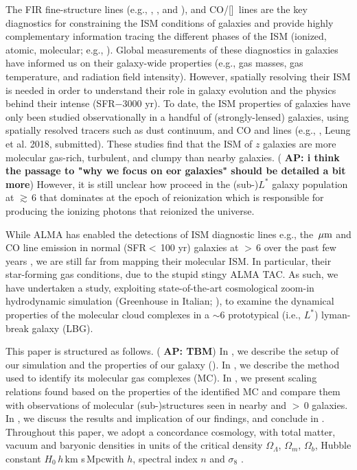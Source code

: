 \documentclass[apj]{emulateapj} %
\newcommand{\AP}[1]{({\bf \color{apcolor} AP: #1})}
\begin{document}
The FIR fine-structure lines (e.g., \cii, \nii, and \oiii), and CO/[\ci]~lines are the key diagnostics for 
constraining the ISM conditions of galaxies and
provide highly complementary information tracing the different phases of the ISM (ionized, 
atomic, molecular; e.g., \citealt{Scoville74a, Rubin85a, Malhotra01a}).
Global measurements of these diagnostics in \highz galaxies 
have informed us on their galaxy-wide properties (e.g., 
gas masses, gas temperature, and radiation field intensity).
However, spatially resolving their ISM is needed in order to understand their role in galaxy evolution and 
the physics behind their intense \SF (SFR$-$3000\,\Msun\,yr\pmOne).
To date, the ISM properties of \highz galaxies 
have only been studied observationally in a handful of (strongly-lensed) 
galaxies, using spatially resolved tracers such as 
dust continuum, and CO and \cii lines (e.g., \citealt{Swinbank11a, Hodge15a, Ferkinhoff15a, Hodge16a},
Leung et al. 2018, submitted).
These studies find that the ISM of $z$ galaxies are more 
molecular gas-rich, turbulent, and clumpy than nearby galaxies.
\AP{i think the passage to "why we focus on eor galaxies" should be detailed a bit more}
However, it is still unclear how \SF proceed in the (sub-)$L^*$ galaxy population at \z$\gtrsim$\,6 
that dominates  \SF at the epoch of reionization which is responsible for producing the 
ionizing photons that reionized the universe.

While ALMA has enabled the detections of 
ISM diagnostic lines e.g., the \,$\mbox{$\mu$m}$ and CO line emission in 
normal (SFR$<$\,100\,\Msun\,yr\pmOne) galaxies at \z$>$\,6 over the past few years \citep[e.g.,][]{Smit18a},
we are still far from mapping their molecular ISM.
In particular, their star-forming gas conditions, due to the stupid stingy ALMA TAC.
As such, we have undertaken a study, exploiting 
state-of-the-art cosmological zoom-in hydrodynamic simulation 
 (Greenhouse in Italian; \citealt{Pallottini17a, Pallottini17b}), to examine 
the dynamical properties of the molecular cloud complexes in a \z$\sim$6 prototypical (i.e., $L^*$) lyman-break
galaxy (LBG).

This paper is structured as follows.
\AP{TBM}
In , we describe the setup of our simulation and the properties of our galaxy (\flower).
In , we describe the method used to identify its molecular gas complexes (MC). 
In , we present scaling relations found based on the properties of 
the identified MC and compare them with observations of molecular 
(sub-)structures seen in nearby and \z$>$\,0 galaxies.
In , we discuss the results and implication of our findings,
and conclude in .
Throughout this paper, we adopt a concordance cosmology, with total matter, vacuum and baryonic densities 
in units of the critical density $\Omega_{\Lambda}$, $\Omega_m$, $\Omega_b$, 
Hubble constant $H_0$\,$h$\,km s\pmOne\,Mpc\pmOne with $h$, 
spectral index $n$ and $\sigma_8$ \citep{Planck14a}.
\end{document}
